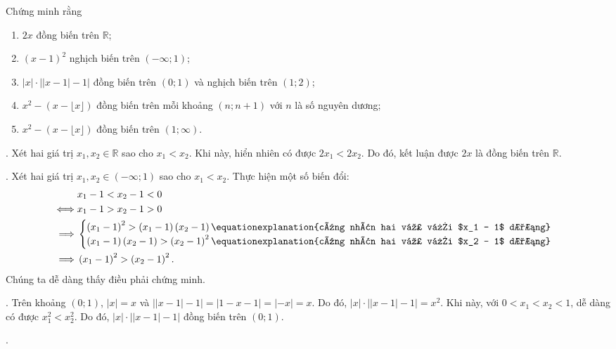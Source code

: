 \exercise Chứng minh rằng
\begin{enumerate}
   \item $2x$ đồng biến trên $\mathbb{R}$;
   \item $(x-1)^2$ nghịch biến trên $\left(-\infty; 1\right)$;
   \item $|x|\cdot \left|\left|x - 1\right| - 1\right|$ đồng biến trên $(0; 1)$ và nghịch biến trên $(1; 2)$;
   \item $x^2 - \left(x - \lfloor x \rfloor\right)$ đồng biến trên mỗi khoảng $(n; n + 1)$ với $n$ là số nguyên dương;
   \item $x^2 - \left(x - \lfloor x \rfloor\right)$ đồng biến trên $\left(1; \infty\right)$.
\end{enumerate}

\solution

\setcounter{subexercise}{1}
. Xét hai giá trị $x_1, x_2 \in \mathbb{R}$ sao cho $x_1 < x_2$. Khi này, hiển nhiên có được $2x_1 < 2x_2$. Do đó, kết luận được $2x$ là đồng biến trên $\mathbb{R}$.

. Xét hai giá trị $x_1, x_2 \in \left(-\infty; 1\right)$ sao cho $x_1 < x_2$. Thực hiện một số biến đổi:
\begin{align*}
   &x_1 - 1 < x_2 - 1 < 0 \\
   \iff &x_1 - 1 > x_2 - 1 > 0 \\
   \implies &\begin{cases}
      \left(x_1 - 1\right)^2 > \left(x_1 - 1\right)\left(x_2 - 1\right) \equationexplanation{cùng nhân hai vế với $x_1 - 1$ dương}\\
      \left(x_1 - 1\right)\left(x_2 - 1\right) > \left(x_2 - 1\right)^2 \equationexplanation{cùng nhân hai vế với $x_2 - 1$ dương}
   \end{cases} \\
   \implies &\left(x_1 - 1\right)^2 > \left(x_2 - 1\right)^2.
\end{align*}
Chúng ta dễ dàng thấy điều phải chứng minh.

. Trên khoảng $(0; 1)$, $|x| = x$ và $\left|\left|x - 1\right| - 1\right| = \left|1 - x - 1\right| = \left|-x\right| = x$. Do đó, $|x|\cdot \left|\left|x - 1\right| - 1\right| = x^2$. Khi này, với $0 < x_1 < x_2 < 1$, dễ dàng có được $x_1^2 < x_2^2$. Do đó, $|x|\cdot \left|\left|x - 1\right| - 1\right|$ đồng biến trên $(0; 1)$.

. 
